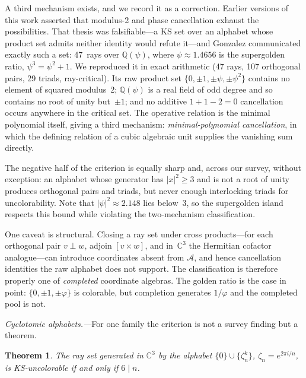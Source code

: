 \documentclass[twocolumn,prl,superscriptaddress,nofootinbib]{revtex4-2}
\newtheorem{theorem}{Theorem}
\newcommand{\C}{\mathbb{C}}
\newcommand{\Q}{\mathbb{Q}}
\begin{document}
A third mechanism exists, and we record it as a correction.  Earlier versions of
this work asserted that modulus-2 and phase cancellation exhaust the possibilities.
That thesis was falsifiable---a KS set over an alphabet whose product set admits
neither identity would refute it---and Gonzalez communicated exactly such a set:
47~rays over $\Q(\psi)$, where $\psi \approx 1.4656$ is the supergolden ratio,
$\psi^3=\psi^2+1$.  We reproduced it in exact arithmetic (47 rays, 107 orthogonal
pairs, 29 triads, ray-critical).  Its raw product set $\{0,\pm1,\pm\psi,\pm\psi^2\}$
contains no element of squared modulus~2; $\Q(\psi)$ is a real field of odd degree
and so contains no root of unity but~$\pm1$; and no additive $1+1-2=0$ cancellation
occurs anywhere in the critical set.  The operative relation is the minimal
polynomial itself, giving a third mechanism: \emph{minimal-polynomial
cancellation}, in which the defining relation of a cubic algebraic unit supplies
the vanishing sum directly.

The negative half of the criterion is equally sharp and, across our survey,
without exception: an alphabet whose generator has $|x|^2 \geq 3$ and is not a
root of unity produces orthogonal pairs and triads, but never enough interlocking
triads for uncolorability.  Note that $|\psi|^2 \approx 2.148$ lies below~3, so
the supergolden island respects this bound while violating the two-mechanism
classification.

One caveat is structural.  Closing a ray set under cross products---for each
orthogonal pair $v \perp w$, adjoin $[v \times w]$, and in~$\C^3$ the Hermitian
cofactor analogue---can introduce coordinates absent from $\mathcal{A}$, and hence
cancellation identities the raw alphabet does not support.  The classification is
therefore properly one of \emph{completed} coordinate algebras.  The golden ratio
is the case in point: $\{0,\pm1,\pm\varphi\}$ is colorable, but completion
generates $1/\varphi$ and the completed pool is not.

\textit{Cyclotomic alphabets.---}For one family the criterion is not a survey
finding but a theorem.

\begin{theorem}
The ray set generated in $\C^3$ by the alphabet $\{0\}\cup\{\zeta_n^k\}$,
$\zeta_n=e^{2\pi i/n}$, is KS-uncolorable if and only if $6 \mid n$.
\end{theorem}
\end{document}
